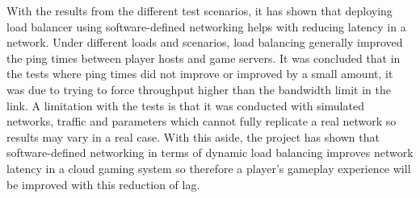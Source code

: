 \newline
\par
With the results from the different test scenarios, it has shown that deploying load balancer using software-defined networking helps with reducing latency in a network. Under different loads and scenarios, load balancing generally improved the ping times between player hosts and game servers. It was concluded that in the tests where ping times did not improve or improved by a small amount, it was due to trying to force throughput higher than the bandwidth limit in the link. A limitation with the tests is that it was conducted with simulated networks, traffic and parameters which cannot fully replicate a real network so results may vary in a real case. With this aside, the project has shown that software-defined networking in terms of dynamic load balancing improves network latency in a cloud gaming system so therefore a player's gameplay experience will be improved with this reduction of lag.

